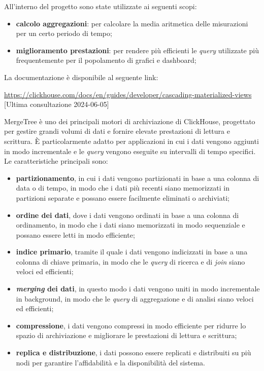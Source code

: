 All'interno del progetto sono state utilizzate ai seguenti scopi:
\begin{itemize}
	\item \textbf{calcolo aggregazioni}: per calcolare la media aritmetica delle misurazioni per un certo periodo di tempo;
	\item \textbf{miglioramento prestazioni}: per rendere più efficienti le \textit{query} utilizzate più frequentemente per il popolamento di grafici e dashboard;
\end{itemize}

La documentazione è disponibile al seguente link:
\begin{center}
	\url{https://clickhouse.com/docs/en/guides/developer/cascading-materialized-views} [Ultima consultazione 2024-06-05]
\end{center}

MergeTree è uno dei principali motori di archiviazione di ClickHouse, progettato per gestire grandi volumi di dati e fornire elevate prestazioni di lettura e scrittura. È particolarmente adatto per applicazioni in cui i dati vengono aggiunti in modo incrementale e le \textit{query} vengono eseguite su intervalli di tempo specifici.
Le caratteristiche principali sono:
\begin{itemize}
	\item \textbf{partizionamento}, in cui i dati vengono partizionati in base a una colonna di data o di tempo, in modo che i dati più recenti siano memorizzati in partizioni separate e possano essere facilmente eliminati o archiviati;
	\item \textbf{ordine dei dati}, dove i dati vengono ordinati in base a una colonna di ordinamento, in modo che i dati siano memorizzati in modo sequenziale e possano essere letti in modo efficiente;
	\item \textbf{indice primario}, tramite il quale i dati vengono indicizzati in base a una colonna di chiave primaria, in modo che le \textit{query} di ricerca e di \textit{join} siano veloci ed efficienti;
	\item \textbf{\textit{merging} dei dati}, in questo modo i dati vengono uniti in modo incrementale in background, in modo che le \textit{query} di aggregazione e di analisi siano veloci ed efficienti;
	\item \textbf{compressione}, i dati vengono compressi in modo efficiente per ridurre lo spazio di archiviazione e migliorare le prestazioni di lettura e scrittura;
	\item \textbf{replica e distribuzione}, i dati possono essere replicati e distribuiti su più nodi per garantire l'affidabilità e la disponibilità del sistema.
\end{itemize}

